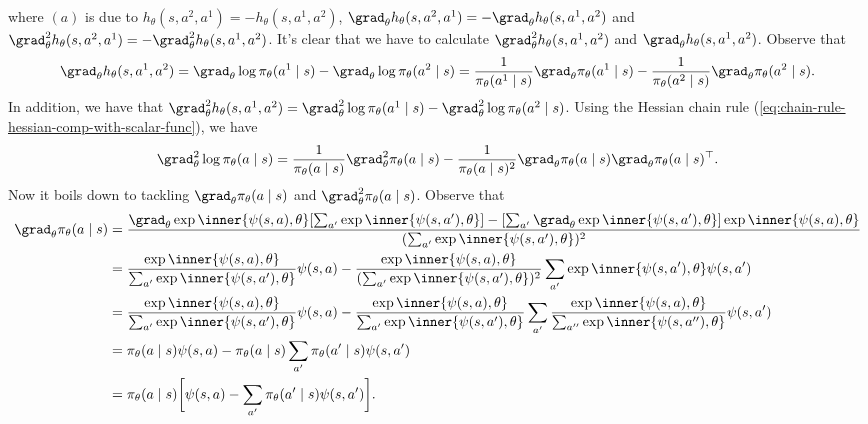 where $(a)$ is due to $h_\theta(s,a^2,a^1)=-h_\theta(s,a^1,a^2)$, $\grad_\theta h_\theta(s,a^2,a^1)=-\grad_\theta h_\theta(s,a^1,a^2)$ and $\grad_\theta^2 h_\theta(s,a^2,a^1)=-\grad_\theta^2 h_\theta(s,a^1,a^2)$. It's clear that we have to calculate $\grad_\theta^2 h_\theta(s,a^1,a^2)$ and $\grad_\theta h_\theta(s,a^1,a^2)$. Observe that
\begin{equation}\label{eq:grad-h-func}
    \grad_\theta h_\theta(s,a^1,a^2) = \grad_\theta \log \pi_\theta(a^1\mid s) - \grad_\theta\log \pi_\theta(a^2\mid s) = \frac{1}{\pi_\theta(a^1\mid s)}\grad_\theta\pi_\theta(a^1\mid s) - \frac{1}{\pi_\theta(a^2\mid s)}\grad_\theta\pi_\theta(a^2\mid s).
\end{equation}
In addition, we have that $\grad_\theta^2 h_\theta(s,a^1,a^2)  = \grad_\theta^2\log\pi_\theta(a^1\mid s) - \grad_\theta^2\log\pi_\theta(a^2\mid s)$. Using the Hessian chain rule (\cref{eq:chain-rule-hessian-comp-with-scalar-func}), we have
\begin{equation*}
    \grad_\theta^2 \log\pi_\theta(a\mid s)  = \frac{1}{\pi_\theta(a\mid s)}\grad_\theta^2\pi_\theta(a\mid s) - \frac{1}{\pi_\theta(a\mid s)^2}\grad_\theta\pi_\theta(a\mid s)\grad_\theta\pi_\theta(a\mid s)^{\top}.
\end{equation*}
Now it boils down to tackling $\grad_\theta\pi_\theta(a\mid s)$ and $\grad_\theta^2\pi_\theta(a\mid s)$. Observe that
\begin{align*}
    \grad_\theta\pi_\theta(a\mid s) &= \frac{\grad_\theta \exp{\inner{\psi(s,a),\theta}}[\sum_{a'}\exp{\inner{\psi(s,a'),\theta}}] - [\sum_{a'}\grad_\theta\exp{\inner{\psi(s,a'),\theta}}]\exp{\inner{\psi(s,a),\theta}}}{(\sum_{a'}\exp{\inner{\psi(s,a'),\theta}})^2}\\
    &=\frac{\exp{\inner{\psi(s,a),\theta}}}{\sum_{a'}\exp{\inner{\psi(s,a'),\theta}}}\psi(s,a) - \frac{\exp{\inner{\psi(s,a),\theta}}}{(\sum_{a'}\exp{\inner{\psi(s,a'),\theta}})^2} \sum_{a'} \exp{\inner{\psi(s,a'),\theta}}\psi(s,a')\\
    &=\frac{\exp{\inner{\psi(s,a),\theta}}}{\sum_{a'}\exp{\inner{\psi(s,a'),\theta}}}\psi(s,a) - \frac{\exp{\inner{\psi(s,a),\theta}}}{\sum_{a'}\exp{\inner{\psi(s,a'),\theta}}} \sum_{a'} \frac{\exp{\inner{\psi(s,a),\theta}}}{\sum_{a''}\exp{\inner{\psi(s,a''),\theta}}}\psi(s,a')\\
    &= \pi_\theta(a\mid s)\psi(s,a) - \pi_\theta(a\mid s) \sum_{a'}\pi_\theta(a'\mid s)\psi(s,a') \\
    &= \pi_\theta(a\mid s)\bigg[\psi(s,a)-\sum_{a'}\pi_\theta(a'\mid s)\psi(s,a')\bigg].
\end{align*}
